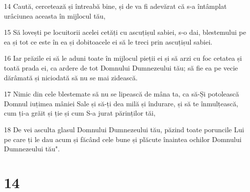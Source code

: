 \par 14 Caută, cercetează și întreabă bine, și de va fi adevărat că s-a întâmplat urâciunea aceasta în mijlocul tău,
\par 15 Să lovești pe locuitorii acelei cetăți cu ascuțișul sabiei, s-o dai, blestemului pe ea și tot ce este în ea și dobitoacele ei să le treci prin ascuțișul sabiei.
\par 16 Iar prăzile ei să le aduni toate în mijlocul pieții ei și să arzi cu foc cetatea și toată prada ei, ca ardere de tot Domnului Dumnezeului tău; să fie ea pe vecie dărâmată și niciodată să nu se mai zidească.
\par 17 Nimic din cele blestemate să nu se lipească de mâna ta, ca să-Și potolească Domnul iuțimea mâniei Sale și să-ți dea milă și îndurare, și să te înmulțească, cum ți-a grăit și ție și cum S-a jurat părinților tăi,
\par 18 De vei asculta glasul Domnului Dumnezeului tău, păzind toate poruncile Lui pe care ți le dau acum și făcând cele bune și plăcute înaintea ochilor Domnului Dumnezeului tău".

\chapter{14}

